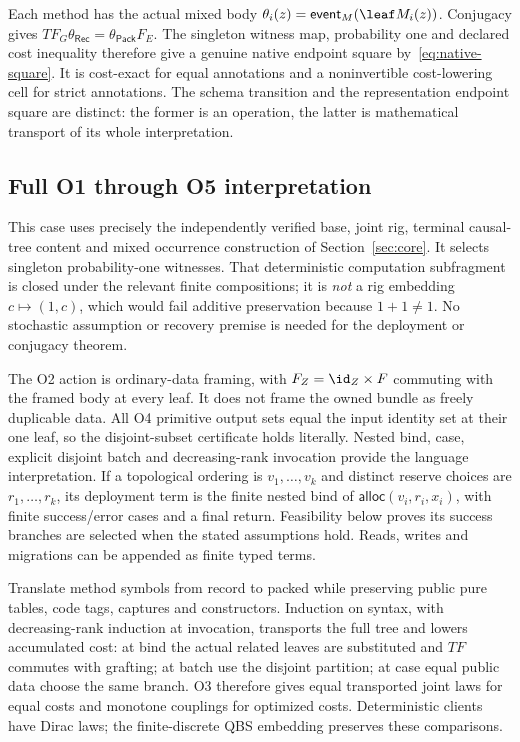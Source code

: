 Each method has the actual mixed body
$\theta_i(z)=\mathsf{event}_M(\leaf M_i(z))$.
Conjugacy gives $TF_G\theta_{\mathsf{Rec}}=
\theta_{\mathsf{Pack}}F_E$. The singleton witness map, probability one
and declared cost inequality therefore give a genuine native endpoint
square by~\eqref{eq:native-square}. It is cost-exact for equal annotations
and a noninvertible cost-lowering cell for strict annotations. The
schema transition and the representation endpoint square are distinct:
the former is an operation, the latter is mathematical transport of its
whole interpretation.

\subsection{Full O1 through O5 interpretation}
This case uses precisely the independently verified base, joint rig,
terminal causal-tree content and mixed occurrence construction of
Section~\ref{sec:core}. It selects singleton probability-one witnesses.
That deterministic computation subfragment is closed under the relevant
finite compositions; it is \emph{not} a rig embedding $c\mapsto(1,c)$,
which would fail additive preservation because $1+1\ne1$.
No stochastic assumption or recovery premise is needed for the deployment
or conjugacy theorem.

The O2 action is ordinary-data framing, with
$F_Z=\id_Z\times F$ commuting with the framed body at every leaf.
It does not frame the owned bundle as freely duplicable data. All O4
primitive output sets equal the input identity set at their one leaf,
so the disjoint-subset certificate holds literally. Nested bind, case,
explicit disjoint batch and decreasing-rank invocation provide the
language interpretation. If a topological ordering is $v_1,\ldots,v_k$
and distinct reserve choices are $r_1,\ldots,r_k$, its deployment term
is the finite nested bind of
$\mathsf{alloc}(v_i,r_i,x_i)$, with finite success/error cases and a final
return. Feasibility below proves its success branches are selected when
the stated assumptions hold. Reads, writes and migrations can be appended
as finite typed terms.

Translate method symbols from record to packed while preserving public
pure tables, code tags, captures and constructors. Induction on syntax,
with decreasing-rank induction at invocation, transports the full tree
and lowers accumulated cost: at bind the actual related leaves are
substituted and $TF$ commutes with grafting; at batch use the disjoint
partition; at case equal public data choose the same branch. O3 therefore
gives equal transported joint laws for equal costs and monotone
couplings for optimized costs. Deterministic clients have Dirac laws;
the finite-discrete QBS embedding preserves these comparisons.

